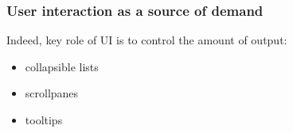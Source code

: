 \begin{frame}
\frametitle{User interaction as a source of demand}

Indeed, key role of UI is to control the amount of output:
\begin{itemize}
\item \pause collapsible lists
\item \pause scrollpanes
\item \pause tooltips
\end{itemize}
\end{frame}

